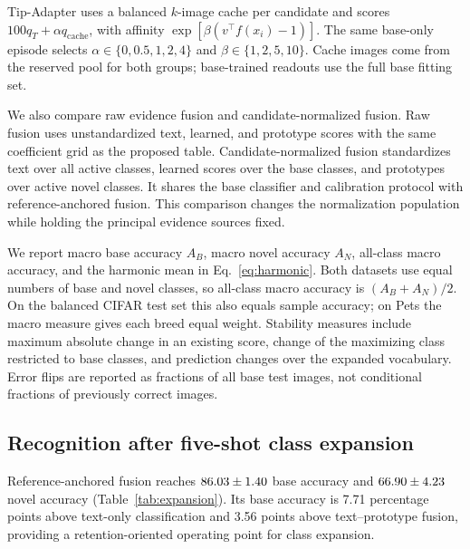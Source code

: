 \documentclass[research]{fcs}
\begin{document}
Tip-Adapter uses a balanced $k$-image cache per candidate and scores $100q_T+\alpha q_{\mathrm{cache}}$, with affinity $\exp[\beta(v^\top f(x_i)-1)]$. The same base-only episode selects $\alpha\in\{0,0.5,1,2,4\}$ and $\beta\in\{1,2,5,10\}$. Cache images come from the reserved pool for both groups; base-trained readouts use the full base fitting set.

We also compare raw evidence fusion and candidate-normalized fusion. Raw fusion uses unstandardized text, learned, and prototype scores with the same coefficient grid as the proposed table. Candidate-normalized fusion standardizes text over all active classes, learned scores over the base classes, and prototypes over active novel classes. It shares the base classifier and calibration protocol with reference-anchored fusion. This comparison changes the normalization population while holding the principal evidence sources fixed.

We report macro base accuracy $A_B$, macro novel accuracy $A_N$, all-class macro accuracy, and the harmonic mean in Eq.~\eqref{eq:harmonic}. Both datasets use equal numbers of base and novel classes, so all-class macro accuracy is $(A_B+A_N)/2$. On the balanced CIFAR test set this also equals sample accuracy; on Pets the macro measure gives each breed equal weight. Stability measures include maximum absolute change in an existing score, change of the maximizing class restricted to base classes, and prediction changes over the expanded vocabulary. Error flips are reported as fractions of all base test images, not conditional fractions of previously correct images.

\subsection{Recognition after five-shot class expansion}
\begin{table}[t]
\centering
\caption{Five-shot expansion from 40 base classes to 80 classes. All values are accuracy percentages, reported as mean $\pm$ sample standard deviation over three distinct class partitions. All readouts share frozen CLIP features; coefficients are selected using base-only calibration. Base and novel performance jointly specify each operating point.}
\label{tab:expansion}
\small
\end{table}

Reference-anchored fusion reaches $86.03\pm1.40$ base accuracy and $66.90\pm4.23$ novel accuracy (Table~\ref{tab:expansion}). Its base accuracy is 7.71 percentage points above text-only classification and 3.56 points above text--prototype fusion, providing a retention-oriented operating point for class expansion.
\end{document}
